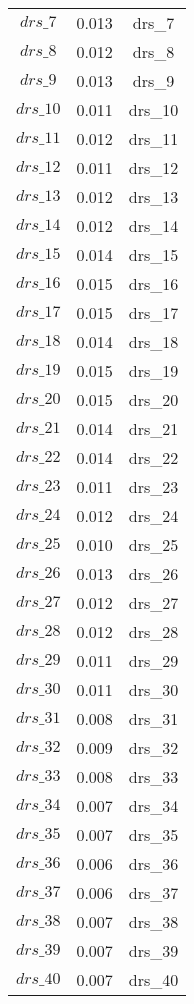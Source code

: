 \begin{center}
\begin{longtable}{ccc}
$drs\_7$ 	 & 	 0.013 	 & 	 drs\_7\\
$drs\_8$ 	 & 	 0.012 	 & 	 drs\_8\\
$drs\_9$ 	 & 	 0.013 	 & 	 drs\_9\\
$drs\_10$ 	 & 	 0.011 	 & 	 drs\_10\\
$drs\_11$ 	 & 	 0.012 	 & 	 drs\_11\\
$drs\_12$ 	 & 	 0.011 	 & 	 drs\_12\\
$drs\_13$ 	 & 	 0.012 	 & 	 drs\_13\\
$drs\_14$ 	 & 	 0.012 	 & 	 drs\_14\\
$drs\_15$ 	 & 	 0.014 	 & 	 drs\_15\\
$drs\_16$ 	 & 	 0.015 	 & 	 drs\_16\\
$drs\_17$ 	 & 	 0.015 	 & 	 drs\_17\\
$drs\_18$ 	 & 	 0.014 	 & 	 drs\_18\\
$drs\_19$ 	 & 	 0.015 	 & 	 drs\_19\\
$drs\_20$ 	 & 	 0.015 	 & 	 drs\_20\\
$drs\_21$ 	 & 	 0.014 	 & 	 drs\_21\\
$drs\_22$ 	 & 	 0.014 	 & 	 drs\_22\\
$drs\_23$ 	 & 	 0.011 	 & 	 drs\_23\\
$drs\_24$ 	 & 	 0.012 	 & 	 drs\_24\\
$drs\_25$ 	 & 	 0.010 	 & 	 drs\_25\\
$drs\_26$ 	 & 	 0.013 	 & 	 drs\_26\\
$drs\_27$ 	 & 	 0.012 	 & 	 drs\_27\\
$drs\_28$ 	 & 	 0.012 	 & 	 drs\_28\\
$drs\_29$ 	 & 	 0.011 	 & 	 drs\_29\\
$drs\_30$ 	 & 	 0.011 	 & 	 drs\_30\\
$drs\_31$ 	 & 	 0.008 	 & 	 drs\_31\\
$drs\_32$ 	 & 	 0.009 	 & 	 drs\_32\\
$drs\_33$ 	 & 	 0.008 	 & 	 drs\_33\\
$drs\_34$ 	 & 	 0.007 	 & 	 drs\_34\\
$drs\_35$ 	 & 	 0.007 	 & 	 drs\_35\\
$drs\_36$ 	 & 	 0.006 	 & 	 drs\_36\\
$drs\_37$ 	 & 	 0.006 	 & 	 drs\_37\\
$drs\_38$ 	 & 	 0.007 	 & 	 drs\_38\\
$drs\_39$ 	 & 	 0.007 	 & 	 drs\_39\\
$drs\_40$ 	 & 	 0.007 	 & 	 drs\_40\\

\end{longtable}
\end{center}
